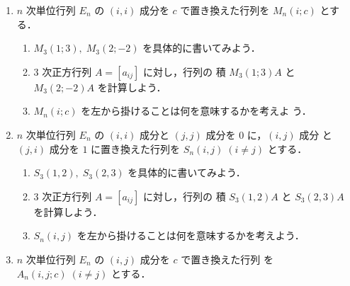\documentclass[11pt, uplatex, dvipdfmx]{jsarticle}
\begin{document}
\begin{enumerate}[label=\ref{sec:transform}.\arabic*]
  \setlength{\itemsep}{1zh}
  
\item \label{trans:mul}$n$ 次単位行列 $E_n$ の $(i,i)$ 成分を $c$ で置き換えた行列を $M_n(i ; c)$ とする．

  \vspace{1ex}

  \begin{enumerate}[label=(\arabic*)]
    \setlength{\itemsep}{1ex}
    
  \item $M_3(1; 3), \; M_3(2; -2)$ を具体的に書いてみよう．

  \item $3$ 次正方行列 $A=\left[ a_{ij}\right]$ に対し，行列の
    積 $M_3(1;3)A$ と $M_3(2; -2) A$ を計算しよう．

  \item $M_n(i;c)$ を左から掛けることは何を意味するかを考えよ
    う．
  \end{enumerate}

\item \label{trans:switch}$n$ 次単位行列 $E_n$ の $(i,i)$ 成分と $(j,j)$ 成分を $0$ に，$(i,j)$ 成分
  と $(j,i)$ 成分を $1$ に置き換えた行列を $S_n(i,j) \; (i \neq j)$ とする．

  
  \vspace{1ex}

  \begin{enumerate}[label=(\arabic*)]
    \setlength{\itemsep}{1ex}
    
  \item $S_3(1,2), \; S_3(2, 3)$ を具体的に書いてみよう．

  \item $3$ 次正方行列 $A=\left[ a_{ij}\right]$ に対し，行列の
    積 $S_3(1,2)A$ と $S_3(2,3)A$ を計算しよう．

  \item $S_n(i,j)$ を左から掛けることは何を意味するかを考えよう．
  \end{enumerate}

\item \label{trans:add}$n$ 次単位行列 $E_n$ の $(i,j)$ 成分を $c$ で置き換えた行列
  を $A_n(i,j;c) \; (i \neq j)$ とする．

  \vspace{1ex}

  \begin{enumerate}[label=(\arabic*)]
    \setlength{\itemsep}{1ex}
    

\end{enumerate}
\end{enumerate}
\end{document}
